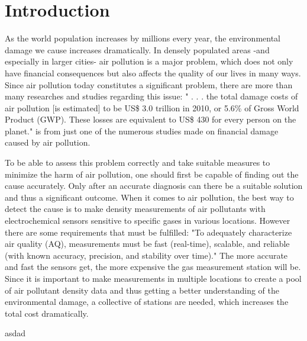 \chapter{Introduction}
\label{sec:introduction}


As the world population increases by millions every year, the environmental damage we cause increases dramatically. In densely populated areas -and especially in larger cities- air pollution is a major problem, which does not only have financial consequences but also affects the quality of our lives in many ways. Since air pollution today constitutes a significant problem, there are more than many researches and studies regarding this issue: " . . . the total damage costs of air pollution [is estimated] to be US\$ 3.0 trillion in 2010, or 5.6\% of Gross World Product (GWP). These losses are equivalent to US\$ 430 for every person on the planet."\cite{Hutton2011} is from just one of the numerous studies made on financial damage caused by air pollution.\par
To be able to assess this problem correctly and take suitable measures to minimize the harm of air pollution, one should first be capable of finding out the cause accurately. Only after an accurate diagnosis can there be a suitable solution and thus a significant outcome. When it comes to air pollution, the best way to detect the cause is to make density measurements of air pollutants with electrochemical sensors sensitive to specific gases in various locations. However there are some requirements that must be fulfilled: "To adequately characterize air quality (AQ), measurements must be fast (real-time), scalable, and reliable (with known accuracy, precision, and stability over time)."\cite{Cross2017} The more accurate and fast the sensors get, the more expensive the gas measurement station will be. Since it is important to make measurements in multiple locations to create a pool of air pollutant density data and thus getting a better understanding of the environmental damage, a collective of stations are needed, which increases the total cost dramatically.\par






asdad%
